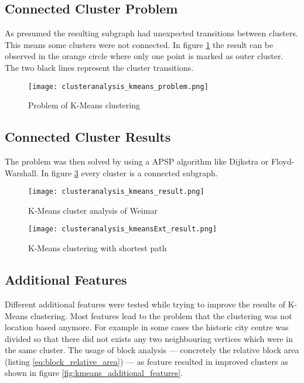 \subsection{Connected Cluster Problem}
As presumed the resulting subgraph had unexpected transitions between clusters. This means some clusters were not connected. In figure \ref{fig:KmeansProblem} the result can be observed in the orange circle where only one point is marked as outer cluster. The two black lines represent the cluster transitions.

\begin{figure}[!ht]
    \centering
    \begin{mdframed}[style=mdthight, userdefinedwidth=0.55\textwidth, align=center]
        \texttt{[image: clusteranalysis\_kmeans\_problem.png]}
    \end{mdframed}
    \caption{Problem of K-Means clustering
        \label{fig:KmeansProblem}}
\end{figure}

\subsection{Connected Cluster Results} \label{sec:K-Means_shortest_path}
The problem was then solved by using a \gls{APSP} algorithm like Dijkstra or Floyd-Warshall. In figure \ref{fig:Kmeansshortestp} every cluster is a connected subgraph.

\begin{figure}
    \centering
    \begin{mdframed}[style=mdthight]
        \texttt{[image: clusteranalysis\_kmeans\_result.png]}
    \end{mdframed}
    \caption{K-Means cluster analysis of Weimar \label{fig:KmeansGenerated}}
\end{figure}

\begin{figure}
    \centering
    \begin{mdframed}[style=mdthight]
        \texttt{[image: clusteranalysis\_kmeansExt\_result.png]}
    \end{mdframed}
    \caption{K-Means clustering with shortest path\label{fig:Kmeansshortestp}}
\end{figure}

\subsection{Additional Features} \label{sec:result_kmeans_additional_features}
Different additional features were tested while trying to improve the results of K-Means clustering. Most features lead to the problem that the clustering was not location based anymore. For example in some cases the historic city centre was divided so that there did not exists any two neighbouring vertices which were in the same cluster. The usage of block analysis --- concretely the relative block area (listing \ref{eq:block_relative_area}) --- as feature resulted in improved clusters as shown in figure \ref{fig:kmeans_additional_features}.

